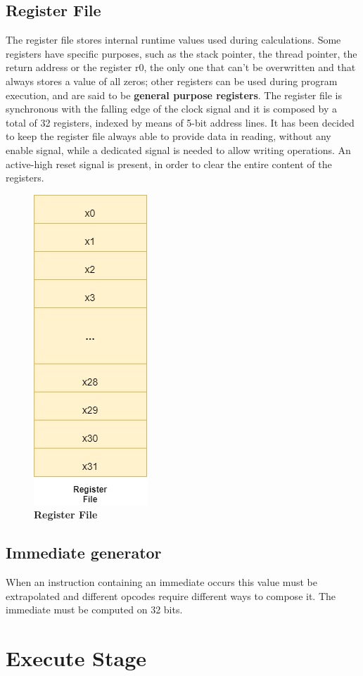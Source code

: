 \subsection{Register File}

The register file stores internal runtime values used during calculations.
Some registers have specific purposes, such as the stack pointer, the thread pointer, the return address or the register r0, the only one that can't be overwritten 
and that always stores a value of all zeros; other registers can be used during program execution, and are said to be \textbf{general purpose registers}.
The register file is synchronous with the falling edge of the clock signal and it is composed by a total of 32 registers, indexed by means of 5-bit address lines.
It has been decided to keep the register file always able to provide data in reading, without any enable signal, while a dedicated signal is needed to allow writing operations.
An active-high reset signal is present, in order to clear the entire content of the registers.

\begin{figure}[!h]
    \centering
        \includegraphics[width=0.2\linewidth]{schematic/RegisterFile.jpg}
        \caption{\textbf{Register File}}
\end{figure}
    

\subsection{Immediate generator}

When an instruction containing an immediate occurs this value must be extrapolated and different opcodes require 
different ways to compose it. The immediate must be computed on 32 bits.

\section{Execute Stage}

